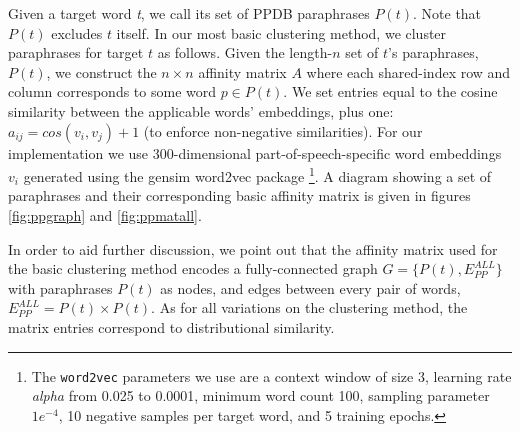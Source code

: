 \documentclass[11pt]{article}
\begin{document}
Given a target word \textit{t}, we call its set of PPDB paraphrases $P(t)$. Note that $P(t)$ excludes $t$ itself. In our most basic clustering method, we cluster paraphrases for target $t$ as follows. Given the length-$n$ set of $t$'s paraphrases, $P(t)$, we construct the $n \times n$ affinity matrix $A$ where each shared-index row and column corresponds to some word $p \in P(t)$. We set entries equal to the cosine similarity between the applicable words' embeddings, plus one: $a_{ij} = cos(v_i,v_j) + 1$ (to enforce non-negative similarities). For our implementation we use 300-dimensional part-of-speech-specific word embeddings $v_i$ generated using the gensim word2vec package \cite{mikolov2013distributed,mikolov2013efficient,ismu:884893} \footnote{The \texttt{word2vec} parameters we use are a context window of size 3, learning rate \textit{alpha} from 0.025 to 0.0001, minimum word count 100, sampling parameter $1e^{-4}$, 10 negative samples per target word, and 5 training epochs.}. A diagram showing a set of paraphrases and their corresponding basic affinity matrix is given in figures \ref{fig:ppgraph} and \ref{fig:ppmatall}.

In order to aid further discussion, we point out that the affinity matrix used for the basic clustering method encodes a fully-connected graph $G = \{P(t), E_{PP}^{ALL}\}$ with paraphrases $P(t)$ as nodes, and edges between every pair of words, $E_{PP}^{ALL} = P(t) \times P(t)$. As for all variations on the clustering method, the matrix entries correspond to distributional similarity.
\end{document}
